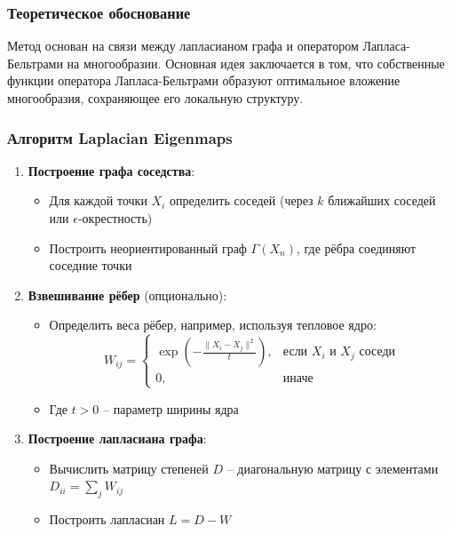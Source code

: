 \documentclass[a4paper,12pt]{article}
\begin{document}
\subsubsection{Теоретическое обоснование}

Метод основан на связи между лапласианом графа и оператором Лапласа-Бельтрами на многообразии. Основная идея заключается в том, что собственные функции оператора Лапласа-Бельтрами образуют оптимальное вложение многообразия, сохраняющее его локальную структуру.

\subsubsection{Алгоритм Laplacian Eigenmaps}

\begin{enumerate}
    \item \textbf{Построение графа соседства}:
    \begin{itemize}
        \item Для каждой точки $X_i$ определить соседей (через $k$ ближайших соседей или $\epsilon$-окрестность)
        \item Построить неориентированный граф $\Gamma(X_n)$, где рёбра соединяют соседние точки
    \end{itemize}
    
    \item \textbf{Взвешивание рёбер} (опционально):
    \begin{itemize}
        \item Определить веса рёбер, например, используя тепловое ядро:
        \begin{equation}
            W_{ij} = \begin{cases}
            \exp\left(-\frac{\|X_i - X_j\|^2}{t}\right), & \text{если } X_i \text{ и } X_j \text{ соседи} \\
            0, & \text{иначе}
            \end{cases}
        \end{equation}
        \item Где $t > 0$ -- параметр ширины ядра
    \end{itemize}
    
    \item \textbf{Построение лапласиана графа}:
    \begin{itemize}
        \item Вычислить матрицу степеней $D$ -- диагональную матрицу с элементами $D_{ii} = \sum_j W_{ij}$
        \item Построить лапласиан $L = D - W$
    \end{itemize}
    

\end{enumerate}
\end{document}
